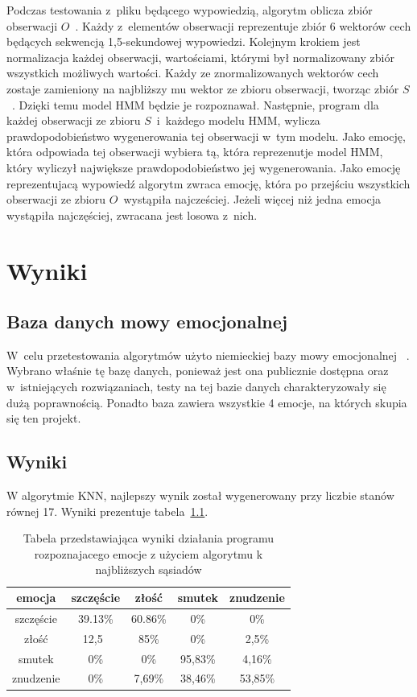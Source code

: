 \documentclass[declaration,shortabstract]{iithesis}
\begin{document}
Podczas testowania z~pliku będącego wypowiedzią, algorytm oblicza zbiór obserwacji $O$~. Każdy z~elementów obserwacji reprezentuje zbiór 6 wektorów cech będących sekwencją 1,5-sekundowej wypowiedzi. Kolejnym krokiem jest normalizacja każdej obserwacji, wartościami, którymi był normalizowany zbiór wszystkich możliwych wartości. Każdy ze znormalizowanych wektorów cech zostaje zamieniony na najbliższy mu wektor ze zbioru obserwacji, tworząc zbiór $S$~. Dzięki temu model HMM będzie je rozpoznawał. Następnie, program dla każdej obserwacji ze zbioru $S$~i~każdego modelu HMM, wylicza prawdopodobieństwo wygenerowania tej obserwacji w~tym modelu. Jako emocję, która odpowiada tej obserwacji wybiera tą, która reprezenutje model HMM, który wyliczył największe prawdopodobieństwo jej wygenerowania. Jako emocję reprezentujacą wypowiedź algorytm zwraca emocję, która po przejściu wszystkich obserwacji ze zbioru $O$~wystąpiła najcześciej. Jeżeli więcej niż jedna emocja wystąpiła najczęściej, zwracana jest losowa z~nich.

\chapter{Wyniki}
\section{Baza danych mowy emocjonalnej}
W~celu przetestowania algorytmów użyto niemieckiej bazy mowy emocjonalnej ~\cite{BDemo}. Wybrano właśnie tę bazę danych, ponieważ jest ona publicznie dostępna oraz w~istniejących rozwiązaniach, testy na tej bazie danych charakteryzowały się dużą poprawnością. Ponadto baza zawiera wszystkie 4 emocje, na których skupia się ten projekt.

\section{Wyniki}
W algorytmie KNN, najlepszy wynik został wygenerowany przy liczbie stanów równej 17. Wyniki prezentuje tabela~\ref{KNN_result}.

\begin{table}[p]
\caption{Tabela przedstawiająca wyniki działania programu rozpoznajacego emocje z użyciem algorytmu k najbliższych sąsiadów}
\begin{center}
  \begin{tabular}{|c|c|c|c|c|}
    \hline
    emocja & szczęście & złość & smutek & znudzenie \\ \hline
    szczęście & 39.13\% & 60.86\% & 0\% & 0\% \\ \hline
	złość & 12,5\ & 85\% & 0\% & 2,5\% \\ \hline
	smutek & 0\% & 0\% & 95,83\% & 4,16\% \\ \hline
	znudzenie & 0\% & 7,69\% & 38,46\% & 53,85\%\\ 
	\hline
  \end{tabular}
  \label{KNN_result}
\end{center}
\end{table}
\end{document}
